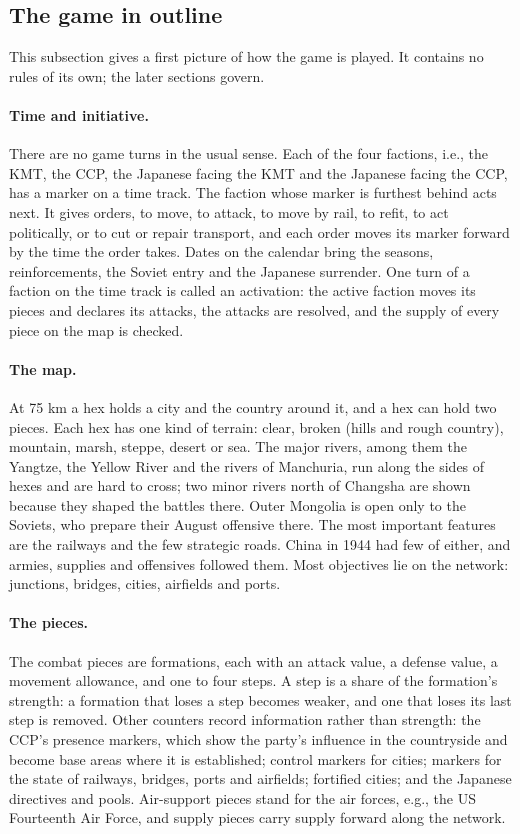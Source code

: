 \documentclass[11pt]{article}
\begin{document}
\subsection{The game in outline}\label{sub:outline}
This subsection gives a first picture of how the game is played. It contains no rules of its own; the later sections govern.

\paragraph{Time and initiative.} There are no game turns in the usual sense. Each of the four factions, i.e., the KMT, the CCP, the Japanese facing the KMT and the Japanese facing the CCP, has a marker on a time track. The faction whose marker is furthest behind acts next. It gives orders, to move, to attack, to move by rail, to refit, to act politically, or to cut or repair transport, and each order moves its marker forward by the time the order takes. Dates on the calendar bring the seasons, reinforcements, the Soviet entry and the Japanese surrender. One turn of a faction on the time track is called an activation: the active faction moves its pieces and declares its attacks, the attacks are resolved, and the supply of every piece on the map is checked.

\paragraph{The map.} At 75 km a hex holds a city and the country around it, and a hex can hold two pieces. Each hex has one kind of terrain: clear, broken (hills and rough country), mountain, marsh, steppe, desert or sea. The major rivers, among them the Yangtze, the Yellow River and the rivers of Manchuria, run along the sides of hexes and are hard to cross; two minor rivers north of Changsha are shown because they shaped the battles there. Outer Mongolia is open only to the Soviets, who prepare their August offensive there. The most important features are the railways and the few strategic roads. China in 1944 had few of either, and armies, supplies and offensives followed them. Most objectives lie on the network: junctions, bridges, cities, airfields and ports.

\paragraph{The pieces.} The combat pieces are formations, each with an attack value, a defense value, a movement allowance, and one to four steps. A step is a share of the formation's strength: a formation that loses a step becomes weaker, and one that loses its last step is removed. Other counters record information rather than strength: the CCP's presence markers, which show the party's influence in the countryside and become base areas where it is established; control markers for cities; markers for the state of railways, bridges, ports and airfields; fortified cities; and the Japanese directives and pools. Air-support pieces stand for the air forces, e.g., the US Fourteenth Air Force, and supply pieces carry supply forward along the network.
\end{document}
